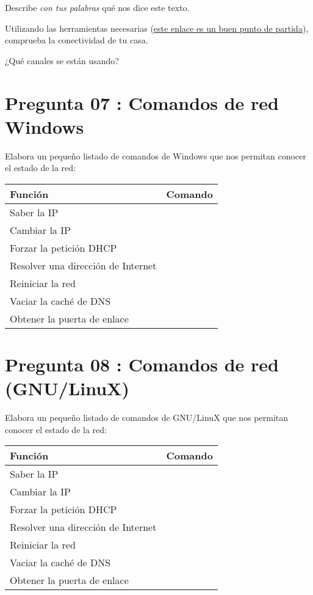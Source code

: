 \documentclass[11pt]{article}
\begin{document}
Describe \emph{con tus palabras} qué nos dice este texto.

Utilizando las herramientas necesarias  (\href{https://bestforandroid.com/wifi-signal-apps/}{este enlace es un buen punto de
partida}), comprueba la conectividad de tu casa.

¿Qué canales se están usando?

\section{Pregunta 07 : Comandos de red Windows}
\label{sec:org90d930a}

Elabora un pequeño listado de comandos de Windows que nos permitan conocer el
estado de la red:

\begin{center}
\begin{tabular}{ll}
Función & Comando\\
\hline
Saber la IP & \\
Cambiar la IP & \\
Forzar la petición DHCP & \\
Resolver una dirección de Internet & \\
Reiniciar la red & \\
Vaciar la caché de DNS & \\
Obtener la puerta de enlace & \\
\end{tabular}
\end{center}

\section{Pregunta 08 : Comandos de red (GNU/LinuX)}
\label{sec:org28836be}

Elabora un pequeño listado de comandos de GNU/LinuX que nos permitan conocer el
estado de la red:

\begin{center}
\begin{tabular}{ll}
Función & Comando\\
\hline
Saber la IP & \\
Cambiar la IP & \\
Forzar la petición DHCP & \\
Resolver una dirección de Internet & \\
Reiniciar la red & \\
Vaciar la caché de DNS & \\
Obtener la puerta de enlace & \\
\end{tabular}
\end{center}
\end{document}
